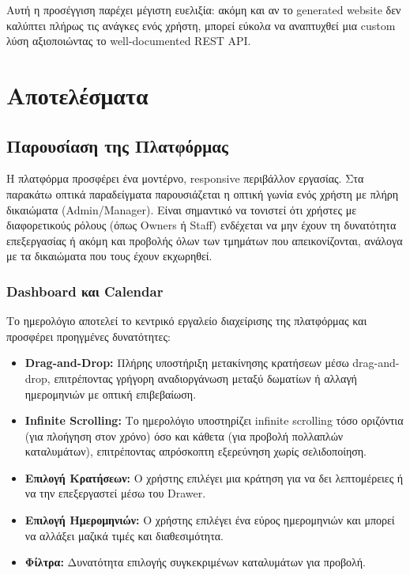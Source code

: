 \documentclass[
	12pt, %
	oneside, %
	greek,
	onehalfspacing, %
	liststotoc, %
	toctotoc, %
	parskip, %
	headsepline, %
]{MastersDoctoralThesis} %
\begin{document}
Αυτή η προσέγγιση παρέχει μέγιστη ευελιξία: ακόμη και αν το generated website δεν καλύπτει πλήρως τις ανάγκες ενός χρήστη, μπορεί εύκολα να αναπτυχθεί μια custom λύση αξιοποιώντας το well-documented REST API.


\chapter{Αποτελέσματα}
\label{chap:results}

\section{Παρουσίαση της Πλατφόρμας}
\label{sec:platform-presentation}

Η πλατφόρμα προσφέρει ένα μοντέρνο, responsive περιβάλλον εργασίας. Στα παρακάτω οπτικά παραδείγματα παρουσιάζεται η οπτική γωνία ενός χρήστη με πλήρη δικαιώματα (Admin/Manager). Είναι σημαντικό να τονιστεί ότι χρήστες με διαφορετικούς ρόλους (όπως Owners ή Staff) ενδέχεται να μην έχουν τη δυνατότητα επεξεργασίας ή ακόμη και προβολής όλων των τμημάτων που απεικονίζονται, ανάλογα με τα δικαιώματα που τους έχουν εκχωρηθεί.

\subsection{Dashboard και Calendar}
\label{subsec:calendar}

Το ημερολόγιο αποτελεί το κεντρικό εργαλείο διαχείρισης της πλατφόρμας και προσφέρει προηγμένες δυνατότητες:

\begin{itemize}
    \item \textbf{Drag-and-Drop:} Πλήρης υποστήριξη μετακίνησης κρατήσεων μέσω drag-and-drop, επιτρέποντας γρήγορη αναδιοργάνωση μεταξύ δωματίων ή αλλαγή ημερομηνιών με οπτική επιβεβαίωση.
    \item \textbf{Infinite Scrolling:} Το ημερολόγιο υποστηρίζει infinite scrolling τόσο οριζόντια (για πλοήγηση στον χρόνο) όσο και κάθετα (για προβολή πολλαπλών καταλυμάτων), επιτρέποντας απρόσκοπτη εξερεύνηση χωρίς σελιδοποίηση.
    \item \textbf{Επιλογή Κρατήσεων:} Ο χρήστης επιλέγει μια κράτηση για να δει λεπτομέρειες ή να την επεξεργαστεί μέσω του Drawer.
    \item \textbf{Επιλογή Ημερομηνιών:} Ο χρήστης επιλέγει ένα εύρος ημερομηνιών και μπορεί να αλλάξει μαζικά τιμές και διαθεσιμότητα.
    \item \textbf{Φίλτρα:} Δυνατότητα επιλογής συγκεκριμένων καταλυμάτων για προβολή.
\end{itemize}
\end{document}
